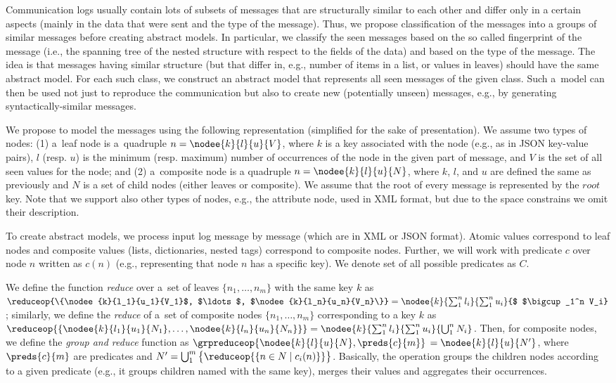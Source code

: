 {Communication logs usually contain lots of subsets of messages that are
structurally similar to each other and differ only in a certain aspects (mainly
in the data that were sent and the type of the message). Thus, we propose
classification of the messages into a groups of similar messages before creating
abstract models.
%
In particular, we classify the seen messages based on the so called fingerprint
of the message (i.e., the spanning tree of the nested structure with respect to
the fields of the data) and based on the type of the message.
%
The idea is that messages having similar structure (but that differ in, e.g.,
number of items in a list, or values in leaves) should have the same abstract
model.
%
For each such class, we construct an abstract model that represents all seen
messages of the given class.
%
Such a~model can then be used not just to reproduce the communication but also
to create new (potentially unseen) messages, e.g., by generating
syntactically-similar messages. 

We propose to model the messages using the following representation (simplified
for the sake of presentation).
%
%
We assume two types of nodes: (1) a~leaf node is a~quadruple $n =
\nodee{k}{l}{u}{V}$, where $k$ is a key associated with the node (e.g., as in
JSON key-value pairs), $l$ (resp. $u$) is the minimum (resp. maximum) number of
occurrences of the node in the given part of message, and $V$ is the set of all
seen values for the node; and (2) a~composite node is a quadruple $n =
\nodee{k}{l}{u}{N}$, where $k$, $l$, and $u$ are defined the same as previously
and $N$ is a set of child nodes (either leaves or composite).
%
We assume that the root of every message is represented by the
$root$ key.
%
Note that we support also other types of nodes, e.g., the attribute node, used
in XML format, but due to the space constrains we omit their description.

To create abstract models, we process input log message by message (which are in
XML or JSON format). 
%
Atomic values correspond to leaf nodes and composite values (lists,
dictionaries, nested tags) correspond to composite nodes.
%
Further, we will work with predicate $c$ over node $n$ written as $c(n)$
(e.g., representing that node $n$ has a specific key). We denote set of
all possible predicates as $C$.

We define the function \emph{reduce} over a~set of leaves $\{n_1,\ldots,n_m\}$
with the same key $k$ as $\reduceop{\{\nodee{k}{l_1}{u_1}{V_1}$, $\ldots$,
$\nodee{k}{l_n}{u_n}{V_n}\}} = \nodee{k}{\sum_1^n l_i}{\sum_1^n u_i}{$
$\bigcup_1^n V_i}$; similarly,  we define the \emph{reduce} of a~set of
composite nodes $\{n_1,\ldots,n_m\}$ corresponding to a key $k$ as
$\reduceop{\{ \nodee{k}{l_1}{u_1}{N_1}, \ldots, \nodee{k}{l_n}{u_n}{N_n}\}} =
\nodee{k}{\sum_1^n l_i}{\sum_1^n u_i}{\bigcup_1^n N_i}$.  
%
Then, for composite nodes, we define the \emph{group and reduce} function as
$\grpreduceop{\nodee{k}{l}{u}{N},\preds{c}{m}}$ $= \nodee{k}{l}{u}{N'}$, where
$\preds{c}{m}$ are predicates and $N' = \bigcup_1^m \big\{ \reduceop{\{n \in N \mid
c_i(n)\}}\big\}$.
%
Basically, the operation groups the children nodes according to a given
predicate (e.g., it groups children named with the same key), merges their
values and aggregates their occurrences.

}
